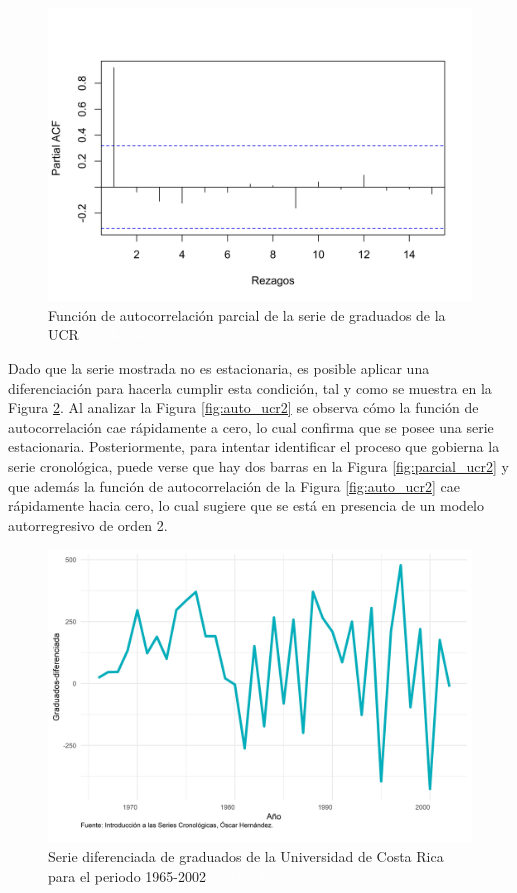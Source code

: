 \documentclass[
]{article}
\begin{document}
\begin{figure}[H]
\includegraphics[width=1\linewidth,height=1\textheight]{Tesis_files/figure-latex/parcial_ucr1-1} \caption{Función de autocorrelación parcial de la serie de graduados de la UCR \textcolor{white}{prueba de aaaaaaaaaaaaaaaaaaaaaaa}}\label{fig:parcial_ucr1}
\end{figure}

Dado que la serie mostrada no es estacionaria, es posible aplicar una
diferenciación para hacerla cumplir esta condición, tal y como se
muestra en la Figura \ref{fig:ejemplo_ucr_diferenciada}. Al analizar la
Figura \ref{fig:auto_ucr2} se observa cómo la función de autocorrelación
cae rápidamente a cero, lo cual confirma que se posee una serie
estacionaria. Posteriormente, para intentar identificar el proceso que
gobierna la serie cronológica, puede verse que hay dos barras en la
Figura \ref{fig:parcial_ucr2} y que además la función de autocorrelación
de la Figura \ref{fig:auto_ucr2} cae rápidamente hacia cero, lo cual
sugiere que se está en presencia de un modelo autorregresivo de orden 2.

\begin{figure}[H]
\includegraphics[width=1\linewidth,height=1\textheight]{Tesis_files/figure-latex/ejemplo_ucr_diferenciada-1} \caption{Serie diferenciada de graduados de la Universidad de Costa Rica para el periodo 1965-2002 \textcolor{white}{prueba de aaaaaaaaaaaaaaaaaaaaaaa}}\label{fig:ejemplo_ucr_diferenciada}
\end{figure}
\end{document}

